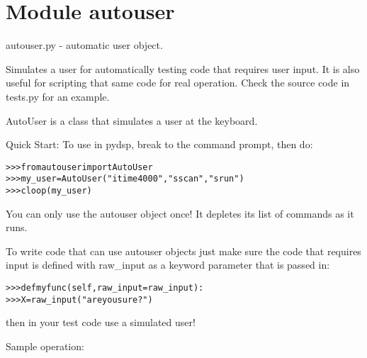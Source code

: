 %
%
%


\section{Module autouser}

    \label{autouser}
autouser.py - automatic user object.

Simulates a user for automatically testing code that requires user input. 
It is also useful for scripting that same code for real operation. Check 
the source code in tests.py for an example.

AutoUser is a class that simulates a user at the keyboard.

Quick Start: To use in pydsp, break to the command prompt, then do:

\begin{alltt}
{\textgreater}{\textgreater}{\textgreater} from autouser import AutoUser
{\textgreater}{\textgreater}{\textgreater} my\_user = AutoUser("itime 4000","sscan","srun")
{\textgreater}{\textgreater}{\textgreater} cloop(my\_user)\end{alltt}

You can only use the autouser object once! It depletes its list of commands
as it runs.

To write code that can use autouser objects just make sure the code that 
requires input is defined with raw\_input as a keyword parameter that is 
passed in:

\begin{alltt}
{\textgreater}{\textgreater}{\textgreater} def myfunc( self, raw\_input=raw\_input) :
{\textgreater}{\textgreater}{\textgreater} X = raw\_input("are you sure?")\end{alltt}

then in your test code use a simulated user!

Sample operation:

